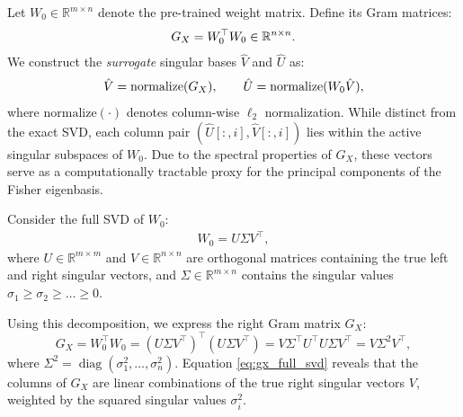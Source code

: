 \documentclass{article}
\theoremstyle{plain}
\theoremstyle{definition}
\theoremstyle{remark}
\begin{document}
\begin{tcolorbox}[colback=gray!10,colframe=gray!100]


Let $W_0 \in \mathbb{R}^{m \times n}$ denote the pre-trained weight matrix.
Define its Gram matrices:
\begin{align}
G_X = W_0^\top W_0 \in \mathbb{R}^{n\times n}. \notag
\end{align}
We construct the \textit{surrogate} singular bases $\hat{V}$ and $\hat{U}$ as:
\begin{align}
\hat{V} = \mathrm{normalize}(G_X), \qquad
\hat{U} = \mathrm{normalize}(W_0 \hat{V}), \notag
\end{align}
where $\mathrm{normalize}(\cdot)$ denotes column-wise $\ell_2$ normalization.
While distinct from the exact SVD, each column pair $(\hat{U}[:,i], \hat{V}[:,i])$ lies within the active singular subspaces of $W_0$. Due to the spectral properties of $G_X$, these vectors serve as a computationally tractable proxy for the principal components of the Fisher eigenbasis.

\end{tcolorbox}


Consider the full SVD of $W_0$:
\begin{align}
W_0 = U \Sigma V^\top,
\end{align}
where $U\in\mathbb{R}^{m\times m}$ and $V\in\mathbb{R}^{n\times n}$ are orthogonal matrices containing the true left and right singular vectors, and $\Sigma\in\mathbb{R}^{m\times n}$ contains the singular values $\sigma_1 \ge \sigma_2 \ge \dots \ge 0$.

Using this decomposition, we express the right Gram matrix $G_X$:
\begin{equation}
G_X = W_0^\top W_0 = (U \Sigma V^\top)^\top (U \Sigma V^\top) = V \Sigma^\top U^\top U \Sigma V^\top = V \Sigma^2 V^\top, \label{eq:gx_full_svd}
\end{equation}
where $\Sigma^2 = \operatorname{diag}(\sigma_1^2, \dots, \sigma_n^2)$.
Equation \eqref{eq:gx_full_svd} reveals that the columns of $G_X$ are linear combinations of the true right singular vectors $V$, weighted by the squared singular values $\sigma_i^2$.
\end{document}
